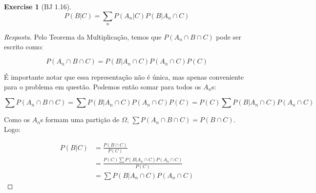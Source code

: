 \documentclass[
]{article}
\theoremstyle{definition}
\theoremstyle{definition}
\theoremstyle{definition}
\newtheorem{exercise}{Exercise}[section]
\theoremstyle{definition}
\theoremstyle{remark}
\begin{document}
\begin{exercise}[BJ 1.16]
\begin{equation*}
P(B|C) = \sum_{n}P(A_{n}|C)P(B|A_{n} \cap C)
\end{equation*}

\begin{proof}[Resposta]
Pelo Teorema da Multiplicação, temos que \(P(A_{n} \cap B \cap C)\) pode ser escrito como:

\begin{equation*}
P(A_{n} \cap B \cap C) = P(B|A_{n} \cap C) P(A_{n} \cap C) P(C)
\end{equation*}

É importante notar que essa representação não é única, mas apenas conveniente para o problema em questão. Podemos então somar para todos os \(A_{n}\)s:

\begin{equation*}
\sum P(A_{n} \cap B \cap C) = \sum P(B|A_{n} \cap C) P(A_{n} \cap C) P(C) = P(C) \sum P(B|A_{n} \cap C) P(A_{n} \cap C)
\end{equation*}

Como os \(A_{n}\)s formam uma partição de \(\Omega\), \(\sum P(A_{n} \cap B \cap C) = P(B \cap C)\). Logo:

\begin{align*}
P(B|C) &= \frac{P(B \cap C)}{P(C)} \\
&= \frac{P(C) \sum P(B|A_{n} \cap C) P(A_{n} \cap C)}{P(C)} \\
&= \sum P(B|A_{n} \cap C) P(A_{n} \cap C)
\end{align*}
\end{proof}

\end{exercise}
\end{document}
